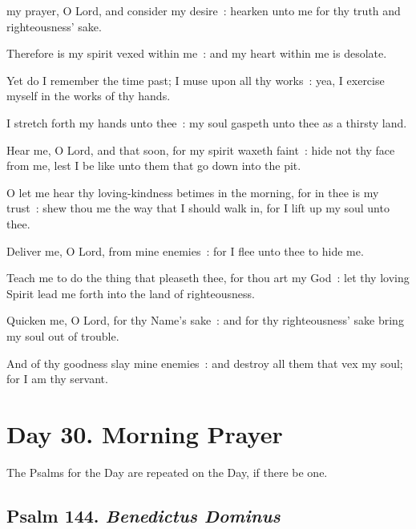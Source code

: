  my prayer, O Lord, and consider my desire~: hearken unto me for thy truth and righteousness' sake.\par
{}
Therefore is my spirit vexed within me~: and my heart within me is desolate.\par
{}Yet do I remember the time past; I muse upon all thy works~: yea, I exercise myself in the works of thy hands.\par
{}I stretch forth my hands unto thee~: my soul gaspeth unto thee as a thirsty land.\par
{}Hear me, O Lord, and that soon, for my spirit waxeth faint~: hide not thy face from me, lest I be like unto them that go down into the pit.\par
{}O let me hear thy loving-kindness betimes in the morning, for in thee is my trust~: shew thou me the way that I should walk in, for I lift up my soul unto thee.\par
{}Deliver me, O Lord, from mine enemies~: for I flee unto thee to hide me.\par
{}Teach me to do the thing that pleaseth thee, for thou art my God~: let thy loving Spirit lead me forth into the land of righteousness.\par
{}Quicken me, O Lord, for thy Name's sake~: and for thy righteousness' sake bring my soul out of trouble.\par
{}And of thy goodness slay mine enemies~: and destroy all them that vex my soul; for I am thy servant.\par

\section*{Day 30. Morning Prayer}

\begin{secrubric}
    The Psalms for the  Day are repeated on the  Day, if there be one.
\end{secrubric}

\subsection{Psalm 144. \textit{Benedictus Dominus}}

